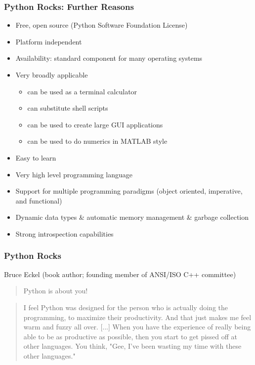 \documentclass[t,10pt,compress=false,usepdftitle=false]{beamer}
\begin{document}
\begin{frame}[fragile]
    \frametitle{Python Rocks: Further Reasons}
     \begin{itemize}
    	\item Free, open source (Python Software Foundation License)
    	\item Platform independent
	\item Availability: standard component for many operating systems
    	\item Very broadly applicable
    	\begin{itemize}
    	     \item can be used as a terminal calculator
    	     \item can substitute shell scripts
    	     \item can be used to create large GUI applications
    	     \item can be used to do numerics in MATLAB style
	\end{itemize}
	\item Easy to learn
	\item Very high level programming language
	\item Support for multiple programming paradigms (object oriented, imperative, and functional)
	\item Dynamic data types \& automatic memory management \& garbage collection
	\item Strong introspection capabilities
    \end{itemize}
\end{frame}

\begin{frame}[fragile]
    \frametitle{Python Rocks}
    Bruce Eckel (book author; founding member of ANSI/ISO C++ committee)
    \begin{quote}Python is about you!\end{quote}
    \pause
    \begin{quote}
    I feel Python was designed for the person who is actually doing the programming, to maximize their productivity. And that just makes me feel warm and fuzzy all over. [...] When you have the experience of really being able to be as productive as possible, then you start to get pissed off at other languages. You think, "Gee, I've been wasting my time with these other languages."  
     \end{quote}
\end{frame}
\end{document}
